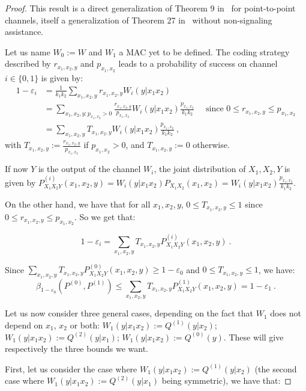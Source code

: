 \documentclass[11pt]{article}
\theoremstyle{definition}
\theoremstyle{remark}
\begin{document}
  \begin{proof}
    This result is a direct generalization of Theorem 9 in~\cite{Matthews12} for point-to-point channels, itself a generalization of Theorem 27 in~\cite{PPV10} without non-signaling assistance.

    Let us name $W_0:=W$ and $W_1$ a MAC yet to be defined. The coding strategy described by $r_{x_1,x_2,y}$ and $p_{x_1, x_2}$ leads to a probability of success on channel $i \in \{0,1\}$ is given by:
  \begin{equation}
    \begin{aligned}
      1 - \varepsilon_i &= \frac{1}{k_1k_2}\sum_{x_1,x_2,y} r_{x_1,x_2,y}W_i(y|x_1x_2)\\
      &= \sum_{x_1,x_2,y:p_{x_1,x_2} > 0} \frac{r_{x_1,x_2,y}}{p_{x_1,x_2}}W_i(y|x_1x_2)\frac{p_{x_1,x_2}}{k_1k_2} \quad \text{ since } 0 \leq r_{x_1,x_2,y} \leq p_{x_1,x_2}\\
      &= \sum_{x_1,x_2,y} T_{x_1,x_2,y}W_i(y|x_1x_2)\frac{p_{x_1,x_2}}{k_1k_2} \ ,
    \end{aligned}
  \end{equation}
  with $T_{x_1,x_2,y} := \frac{r_{x_1,x_2,y}}{p_{x_1,x_2}}$ if $p_{x_1,x_2} > 0$, and $T_{x_1,x_2,y} :=0$ otherwise.

  If now $Y$ is the output of the channel $W_i$, the joint distribution of $X_1,X_2,Y$ is given by $P^{(i)}_{X_1X_2Y}(x_1,x_2,y) = W_i(y|x_1x_2)P_{X_1X_2}(x_1,x_2)= W_i(y|x_1x_2)\frac{p_{x_1,x_2}}{k_1k_2}$.

  On the other hand, we have that for all $x_1,x_2,y$, $0 \leq T_{x_1,x_2,y} \leq 1$ since $0 \leq r_{x_1,x_2,y} \leq p_{x_1,x_2}$. So we get that:

  \[ 1 - \varepsilon_i = \sum_{x_1,x_2,y} T_{x_1,x_2,y}P^{(i)}_{X_1X_2Y}(x_1,x_2,y) \ . \]

  Since $\sum_{x_1,x_2,y} T_{x_1,x_2,y}P^{(0)}_{X_1X_2Y}(x_1,x_2,y) \geq 1 - \varepsilon_0$ and $0 \leq T_{x_1,x_2,y} \leq 1$, we have:
  \[ \beta_{1-\varepsilon_0}(P^{(0)},P^{(1)}) \leq \sum_{x_1,x_2,y} T_{x_1,x_2,y}P^{(1)}_{X_1X_2Y}(x_1,x_2,y) = 1 - \varepsilon_1 \ . \]

  Let us now consider three general cases, depending on the fact that $W_1$ does not depend on $x_1$, $x_2$ or both: $W_1(y|x_1x_2) := Q^{(1)}(y|x_2)$; $W_1(y|x_1x_2) := Q^{(2)}(y|x_1)$;  $W_1(y|x_1x_2) := Q^{(0)}(y)$. These will give respectively the three bounds we want.
 
  First, let us consider the case where $W_1(y|x_1x_2) := Q^{(1)}(y|x_2)$ (the second case where $W_1(y|x_1x_2) := Q^{(2)}(y|x_1)$ being symmetric), we have that:


\end{proof}
\end{document}
